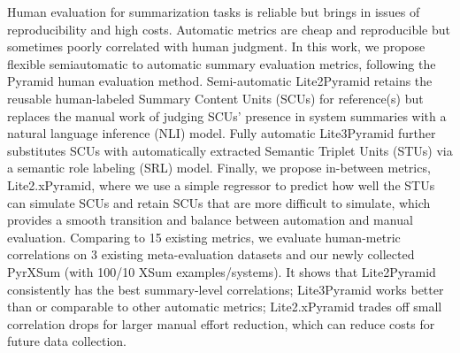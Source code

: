 Human evaluation for summarization tasks is reliable but brings in issues of reproducibility and high costs. Automatic metrics are cheap and reproducible but sometimes poorly correlated with human judgment. In this work, we propose flexible semiautomatic to automatic summary evaluation metrics, following the Pyramid human evaluation method. Semi-automatic Lite2Pyramid retains the reusable human-labeled Summary Content Units (SCUs) for reference(s) but replaces the manual work of judging SCUs' presence in system summaries with a natural language inference (NLI) model. Fully automatic Lite3Pyramid further substitutes SCUs with automatically extracted Semantic Triplet Units (STUs) via a semantic role labeling (SRL) model. Finally, we propose in-between metrics, Lite2.xPyramid, where we use a simple regressor to predict how well the STUs can simulate SCUs and retain SCUs that are more difficult to simulate, which provides a smooth transition and balance between automation and manual evaluation. Comparing to 15 existing metrics, we evaluate human-metric correlations on 3 existing meta-evaluation datasets and our newly collected PyrXSum (with 100/10 XSum examples/systems). It shows that Lite2Pyramid consistently has the best summary-level correlations; Lite3Pyramid works better than or comparable to other automatic metrics; Lite2.xPyramid trades off small correlation drops for larger manual effort reduction, which can reduce costs for future data collection.
